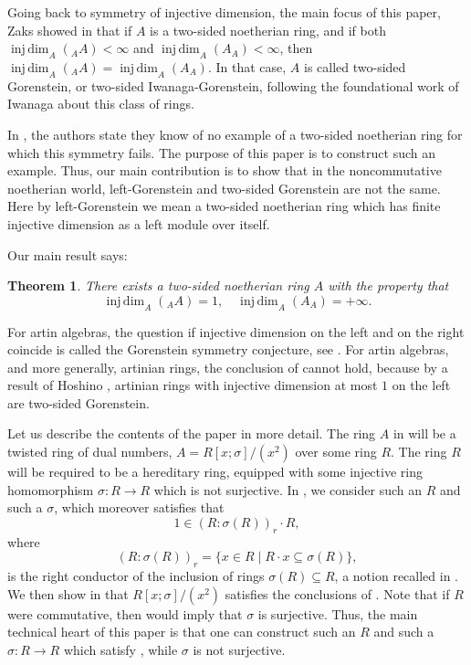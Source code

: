 \documentclass{amsart}
\newtheorem{cthm}{Theorem}
\theoremstyle{definition}
\newcommand{\injdim}{\operatorname{inj\,dim}}
\numberwithin{equation}{section}
\begin{document}
Going back to symmetry of injective dimension, the main focus of this paper, Zaks showed in \cite[Lemma A]{Zaks} that if $A$ is a two-sided noetherian ring, and if both $\injdim_A( \phantom{ }_A A) < \infty$ and 
$\injdim_A (A_A) < \infty$, then
$\injdim_A( \phantom{ }_A A) =  \injdim_A (A_A)$.
In that case, $A$ is called two-sided Gorenstein, 
or two-sided Iwanaga-Gorenstein, following the foundational work \cite{IW1,IW2} of Iwanaga about this class of rings.

In \cite[Section 2]{KKS}, the authors state they know of no example of a two-sided noetherian ring for which this symmetry fails. The purpose of this paper is to construct such an example.
Thus, our main contribution is to show that in the noncommutative noetherian world, left-Gorenstein and two-sided Gorenstein are not the same. Here by left-Gorenstein we mean a two-sided noetherian ring which has finite injective dimension as a left module over itself.

Our main result says:
\begin{cthm}\label{cthm:main}
There exists a two-sided noetherian ring $A$ with the property that
\[
\injdim_A( \phantom{ }_A A) = 1, \quad \injdim_A(A_A) = +\infty.
\]
\end{cthm}

For artin algebras, the question if injective dimension on the left and on the right coincide is called the Gorenstein symmetry conjecture,
see \cite{AusRei,BeKr,BReit}. For artin algebras,
and more generally, artinian rings, the conclusion of  cannot hold, because by a result of Hoshino \cite{Ho},
artinian rings with injective dimension at most $1$ on the left are two-sided Gorenstein.

Let us describe the contents of the paper in more detail.
The ring $A$ in  will be a twisted ring of dual numbers, $A = R[x;\sigma]/(x^2)$ over some ring $R$. 
The ring $R$ will be required to be a hereditary ring,
equipped with some injective ring homomorphism $\sigma:R \to R$ which is not surjective. In , we consider such an $R$ and such a $\sigma$, which moreover satisfies that
\begin{equation}\label{eqn:condInt}
1 \in (R:\sigma(R))_r\cdot R,
\end{equation}
where 
\[
(R:\sigma(R))_r = \{x \in R \mid R\cdot x \subseteq \sigma(R)\},
\]
is the right conductor of the inclusion of rings $\sigma(R) \subseteq R$, 
a notion recalled in .
We then show in  that $R[x;\sigma]/(x^2)$ satisfies the conclusions of .
Note that if $R$ were commutative, then  would imply that $\sigma$ is surjective. Thus, the main technical heart of this paper is that one can construct such an $R$ and such a $\sigma:R \to R$ which satisfy , while $\sigma$ is not surjective.
\end{document}
